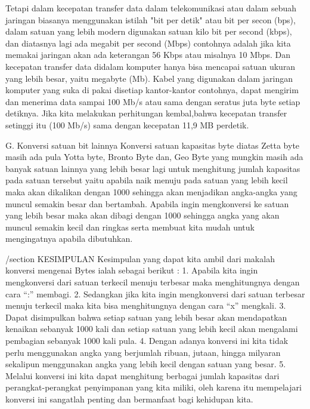 Tetapi dalam kecepatan transfer data dalam telekomunikasi atau dalam sebuah jaringan biasanya menggunakan istilah "bit per detik" atau
bit per secon (bps), dalam satuan yang lebih modern digunakan satuan kilo bit per second (kbps), dan diatasnya lagi ada megabit per second (Mbps)
contohnya adalah jika kita memakai jaringan akan ada keterangan 56 Kbps atau misalnya 10 Mbps. Dan kecepatan transfer data didalam komputer hanya bisa mencapai satuan ukuran yang lebih besar, yaitu megabyte (Mb). Kabel yang digunakan dalam jaringan komputer yang suka di pakai disetiap kantor-kantor  contohnya, dapat mengirim dan menerima data sampai 100 Mb/s atau sama dengan seratus juta byte setiap detiknya. Jika kita melakukan perhitungan kembal,bahwa kecepatan transfer setinggi itu (100 Mb/s) sama dengan kecepatan 11,9 MB perdetik.

G. Konversi satuan bit lainnya
Konversi satuan kapasitas byte diatas Zetta byte masih ada pula Yotta byte, Bronto Byte dan, Geo Byte yang mungkin masih ada banyak satuan lainnya yang lebih besar lagi untuk menghitung jumlah kapasitas pada satuan tersebut yaitu apabila naik menuju pada satuan yang lebih kecil maka akan dikalikan dengan 1000 sehingga akan menjadikan angka-angka yang muncul semakin besar dan bertambah. 
Apabila ingin mengkonversi ke satuan yang lebih besar maka akan dibagi dengan 1000 sehingga angka yang akan muncul semakin kecil dan ringkas serta membuat kita mudah untuk mengingatnya apabila dibutuhkan.

/section {KESIMPULAN}
Kesimpulan yang dapat kita ambil dari makalah konversi mengenai Bytes ialah sebagai berikut :
1.	Apabila kita ingin mengkonversi dari satuan terkecil menuju terbesar maka menghitungnya dengan cara “:” membagi.
2.	Sedangkan jika kita ingin mengkonversi dari satuan terbesar menuju terkecil maka kita bisa menghitungnya dengan cara “x” mengkali.
3.	Dapat disimpulkan bahwa setiap satuan yang lebih besar akan mendapatkan kenaikan sebanyak 1000 kali dan setiap satuan yang lebih kecil akan mengalami pembagian sebanyak 1000 kali pula.
4.	Dengan adanya konversi ini kita tidak perlu menggunakan angka yang berjumlah ribuan, jutaan, hingga milyaran sekalipun menggunakan angka yang lebih kecil dengan satuan yang besar.
5.	Melalui konversi ini kita dapat menghitung berbagai jumlah kapasitas dari perangkat-perangkat penyimpanan yang kita miliki, oleh karena itu mempelajari konversi ini sangatlah penting dan bermanfaat bagi kehidupan kita. 
